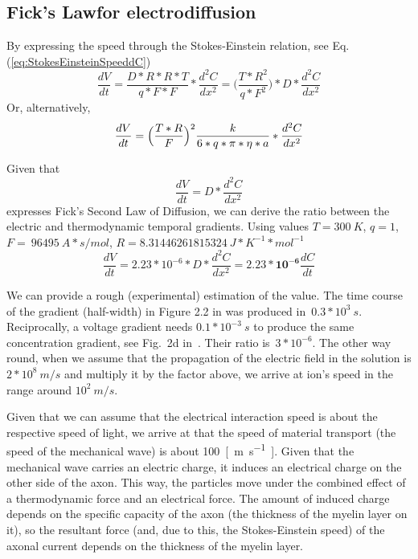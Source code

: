 \subsection[Fick's Law]{Fick's Lawfor electrodiffusion\label{sec:Fick-Electrodiffusion}}

{
By expressing the speed through the Stokes-Einstein relation, see Eq.(\ref{eq:StokesEinsteinSpeeddC})
\begin{equation}
	\frac{dV}{dt}=\frac{D*R*R*T}{q*F*F}*\frac{d^2C}{dx^2}=\biggl(\frac{T*R^2}{q*F^2}\biggr)*D*\frac{d^2C}{dx^2}\label{eq:Nernst-dVdtStokes}
\end{equation}
%
Or, alternatively,
%
\begin{equation}
	\frac{dV}{dt} = \Bigl(\frac{T*R}{F}\Bigr)^2\frac{k}{6*q*\pi*\eta*a}*\frac{d^2C}{dx^2} \label{eq:Nernst-dVdt1}
\end{equation}

Given that 
\begin{equation}
\frac{dV}{dt}= D*\frac{d^2C}{dx^2}\label{Fick'sSecond}
\end{equation}
expresses Fick’s Second Law of Diffusion, we can derive 
the ratio between the electric and thermodynamic temporal gradients.
Using values 
$T=300\ K$, $q=1$, $F=\ 96495\ A*s/mol$, $R=8.31446261815324\ J*K^{-1}*mol^{-1}$
\begin{equation}
	\frac{dV}{dt}=2.23*10^{-6}*D*\frac{d^2C}{dx^2} = \mathbf{2.23*10^{-6}}\frac{dC}{dt}\label{eq:PhysicsGradientRatio}
\end{equation}
}

We can provide a rough (experimental) estimation of the value. The time course of the gradient (half-width) in Figure 2.2 in \cite{JohnstonWuNeurophysiology:1995}  was produced in~$0.3*10^3~ s$. Reciprocally, a voltage gradient needs $0.1*10^{-3}\ s$
to produce the same concentration gradient, see
Fig.~2d in~\cite{BeanActionPotential:2007}. Their ratio is\ $3*10^{-6}$.
The other way round, when we assume that the propagation of the electric field in the solution is $2*10^{8}\ m/s$ and multiply it by the factor above, we arrive at ion's speed in the range around $10^{2}\ m/s$.

Given that we can assume that the electrical interaction speed is
about the respective speed of light, we arrive at
that the speed of material transport (the speed of the mechanical wave) is about \SI{100}{[\meter\per\second]}. Given that the mechanical wave 
carries an electric charge, it induces an electrical charge on the other side
of the axon. This way, the particles move under the combined effect of a thermodynamic force and an electrical force. The amount of induced charge depends on the specific capacity 
of the axon (the thickness of the myelin layer on it), so the resultant
force (and, due to this, the Stokes-Einstein speed) of the 
axonal current depends on the thickness of the myelin layer.


